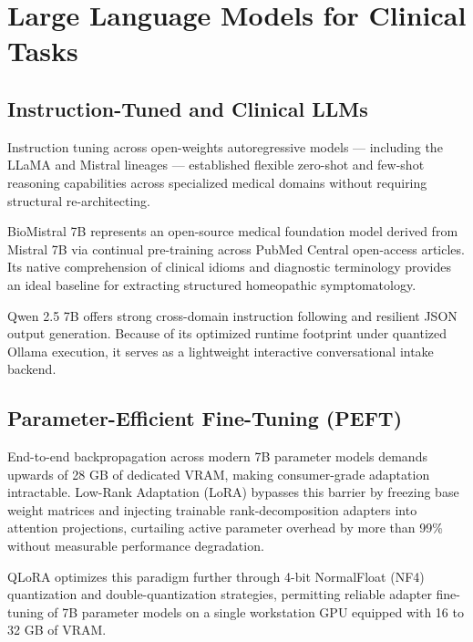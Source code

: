 
\section{Large Language Models for Clinical Tasks}

\subsection{Instruction-Tuned and Clinical LLMs}

Instruction tuning across open-weights autoregressive models --- including the LLaMA \cite{touvron2023llama} and Mistral \cite{jiang2023mistral} lineages --- established flexible zero-shot and few-shot reasoning capabilities across specialized medical domains without requiring structural re-architecting.

BioMistral 7B \cite{labrak2024biomistral} represents an open-source medical foundation model derived from Mistral 7B via continual pre-training across PubMed Central open-access articles. Its native comprehension of clinical idioms and diagnostic terminology provides an ideal baseline for extracting structured homeopathic symptomatology.

Qwen 2.5 7B \cite{bai2023qwen} offers strong cross-domain instruction following and resilient JSON output generation. Because of its optimized runtime footprint under quantized Ollama execution, it serves as a lightweight interactive conversational intake backend.

\subsection{Parameter-Efficient Fine-Tuning (PEFT)}

End-to-end backpropagation across modern 7B parameter models demands upwards of 28 GB of dedicated VRAM, making consumer-grade adaptation intractable. Low-Rank Adaptation (LoRA) \cite{hu2022lora} bypasses this barrier by freezing base weight matrices and injecting trainable rank-decomposition adapters into attention projections, curtailing active parameter overhead by more than 99\% without measurable performance degradation.

QLoRA \cite{dettmers2023qlora} optimizes this paradigm further through 4-bit NormalFloat (NF4) quantization and double-quantization strategies, permitting reliable adapter fine-tuning of 7B parameter models on a single workstation GPU equipped with 16 to 32 GB of VRAM.

